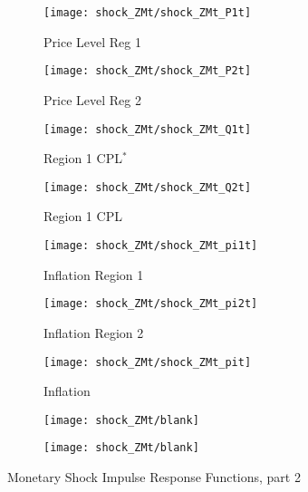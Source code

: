 \documentclass[../thesis.tex]{subfiles}
\begin{document}
\begin{figure}[h!]
	\begin{subfigure}[b]{0.3\textwidth}
		\centering
		\texttt{[image: shock\_ZMt/shock\_ZMt\_P1t]}
		\caption{\footnotesize Price Level Reg 1}
		\label{fig:ZMt-P1t}
	\end{subfigure}
	\hfill
	\begin{subfigure}[b]{0.3\textwidth}
		\centering
		\texttt{[image: shock\_ZMt/shock\_ZMt\_P2t]}
		\caption{\footnotesize Price Level Reg 2}
		\label{fig:ZMt-P2t}
	\end{subfigure}
	\hfill
	\begin{subfigure}[b]{0.3\textwidth}
		\centering
		\texttt{[image: shock\_ZMt/shock\_ZMt\_Q1t]}
		\caption{\footnotesize Region 1 CPL$^{\ast}$}
		\label{fig:ZMt-Q1t}
	\end{subfigure}
	\hfill		
	\vspace*{0.5cm}
	
	
	\begin{subfigure}[b]{0.3\textwidth}
		\centering
		\texttt{[image: shock\_ZMt/shock\_ZMt\_Q2t]}
		\caption{\footnotesize Region 1 CPL}
		\label{fig:ZMt-Q2t}
	\end{subfigure}
	\hfill
	\begin{subfigure}[b]{0.3\textwidth}
		\centering
		\texttt{[image: shock\_ZMt/shock\_ZMt\_pi1t]}
		\caption{\footnotesize Inflation Region 1}
		\label{fig:ZMt-pi1t}
	\end{subfigure}
	\hfill
	\begin{subfigure}[b]{0.3\textwidth}
		\centering
		\texttt{[image: shock\_ZMt/shock\_ZMt\_pi2t]}
		\caption{\footnotesize Inflation Region 2}
		\label{fig:ZMt-pi2t}
	\end{subfigure}
	\hfill
	\vspace*{0.5cm}
	
	
	\begin{subfigure}[b]{0.3\textwidth}
		\centering
		\texttt{[image: shock\_ZMt/shock\_ZMt\_pit]}
		\caption{\footnotesize Inflation}
		\label{fig:ZMt-pit}
	\end{subfigure}
	\hfill
	\begin{subfigure}[b]{0.3\textwidth}
		\centering
		\texttt{[image: shock\_ZMt/blank]}
	\end{subfigure}
	\hfill
	\begin{subfigure}[b]{0.3\textwidth}
		\centering
		\texttt{[image: shock\_ZMt/blank]}
	\end{subfigure}
	\hfill
	\vspace*{0.5cm}		
	\caption{Monetary Shock Impulse Response Functions, part 2}
	\label{fig:ZMt-irf2}
\end{figure}
\end{document}
